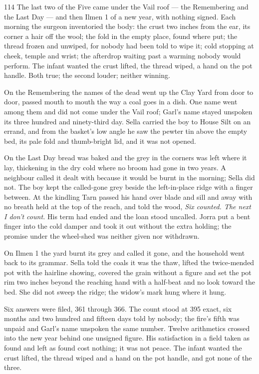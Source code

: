 \begin{CRchronicle}{114}
The last two of the Five came under the Vail roof — the Remembering and the Last Day — and then Ilmen 1 of a new year, with nothing signed. Each morning the surgeon inventoried the body: the crust two inches from the ear, its corner a hair off the wool; the fold in the empty place, found where put; the thread frozen and unwiped, for nobody had been told to wipe it; cold stopping at cheek, temple and wrist; the afterdrop waiting past a warming nobody would perform. The infant wanted the crust lifted, the thread wiped, a hand on the pot handle. Both true; the second louder; neither winning.

On the Remembering the names of the dead went up the Clay Yard from door to door, passed mouth to mouth the way a coal goes in a dish. One name went among them and did not come under the Vail roof; Garl’s name stayed unspoken its three hundred and ninety-third day. Sella carried the boy to House Silt on an errand, and from the basket’s low angle he saw the pewter tin above the empty bed, its pale fold and thumb-bright lid, and it was not opened.

On the Last Day bread was baked and the grey in the corners was left where it lay, thickening in the dry cold where no broom had gone in two years. A neighbour called it dealt with because it would be burnt in the morning; Sella did not. The boy kept the called-gone grey beside the left-in-place ridge with a finger between. At the kindling Tarn passed his hand over blade and sill and away with no breath held at the top of the reach, and told the wood, \emph{Six counted. The next I don’t count.} His term had ended and the loan stood uncalled. Jorra put a bent finger into the cold damper and took it out without the extra holding; the promise under the wheel-shed was neither given nor withdrawn.

On Ilmen 1 the yard burnt its grey and called it gone, and the household went back to its grammar. Sella told the coals it was the thaw, lifted the twice-mended pot with the hairline showing, covered the grain without a figure and set the pot rim two inches beyond the reaching hand with a half-beat and no look toward the bed. She did not sweep the ridge; the widow’s mark hung where it hung.

Six answers were filed, 361 through 366. The count stood at 395 exact, six months and two hundred and fifteen days told by nobody; the fire’s fifth was unpaid and Garl’s name unspoken the same number. Twelve arithmetics crossed into the new year behind one unsigned figure. His satisfaction in a field taken as found and left as found cost nothing; it was not peace. The infant wanted the crust lifted, the thread wiped and a hand on the pot handle, and got none of the three.
\end{CRchronicle}
